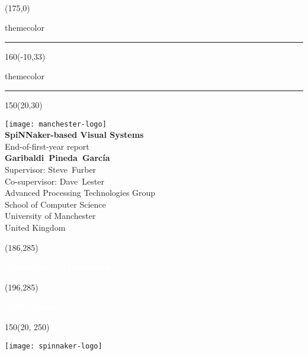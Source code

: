 \setlength{\TPHorizModule}{1mm}
\setlength{\TPVertModule}{1mm}
  ~
  \begin{textblock}{50}(175,0)
    \begin{color}{themecolor}
      \rule{3cm}{30cm}
    \end{color}
  \end{textblock}

  \begin{textblock}{160}(-10,33)
    \begin{color}{themecolor}
      \rule{18.4cm}{2.2cm}
    \end{color}
  \end{textblock}
  
  \begin{textblock}{150}(20,30)
    \begin{flushright}
    \texttt{[image: manchester-logo]}\\[5em]
    
    {\noindent\Huge\bfseries SpiNNaker-based Visual Systems}\\[2em]
    
    {\noindent\huge End-of-first-year report }\\[5em]
    
    {\noindent\Large\bfseries Garibaldi~Pineda~García}\\[0.5em]
    {\noindent\Large Supervisor: Steve~Furber}\\[0.1em]
    {\noindent\Large Co-supervisor: Dave~Lester}\\[1em]
    {\noindent\large Advanced Processing Technologies Group\\
      School of Computer Science \\
      University of Manchester\\[0.4em]
      United Kingdom}
    \end{flushright}
  \end{textblock}
  
  
  \begin{textblock}{20}(186,285)
    \begin{rotate}{90}
      {\huge\bfseries \textcolor{white}{University of Manchester}}
    \end{rotate}
  \end{textblock}
  \begin{textblock}{20}(196,285)
    \begin{rotate}{90}
      {\huge\bfseries \textcolor{white}{APT Group}}
    \end{rotate}
  \end{textblock}  

  \begin{textblock}{150}(20, 250)
    \begin{flushright}
    \texttt{[image: spinnaker-logo]}
    \end{flushright}
  \end{textblock}
  
